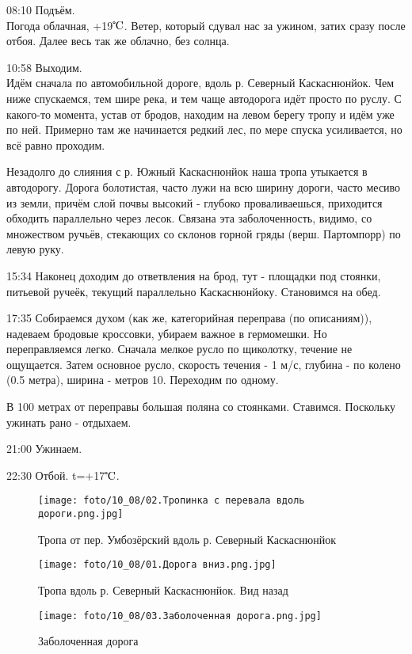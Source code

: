 08:10 Подъём.\\
Погода облачная, +19$\tccentigrade$. Ветер, который сдувал нас за ужином, затих сразу после отбоя.
Далее весь так же облачно, без солнца.

10:58 Выходим.\\
Идём сначала по автомобильной дороге, вдоль р. Северный Каскаснюнйок. Чем ниже спускаемся, тем шире река,
и тем чаще автодорога идёт просто по руслу. С какого-то момента, устав от бродов, находим на левом берегу тропу
и идём уже по ней.  Примерно там же начинается редкий лес, по мере спуска усиливается, но всё равно проходим.

Незадолго до слияния с р. Южный Каскаснюнйок наша тропа утыкается в автодорогу.
Дорога болотистая, часто лужи на всю ширину дороги, часто месиво из земли, причём слой почвы высокий - глубоко проваливаешься,
приходится обходить параллельно через лесок. Связана эта заболоченность, видимо, со множеством ручьёв,
стекающих со склонов горной гряды (верш. Партомпорр) по левую руку.

15:34 Наконец доходим до ответвления на брод, тут - площадки под стоянки, питьевой ручеёк, текущий параллельно Каскаснюнйоку.
Становимся на обед.

17:35 Собираемся духом (как же, категорийная переправа (по описаниям)), надеваем бродовые кроссовки,
убираем важное в гермомешки. Но переправляемся легко. Сначала мелкое русло по щиколотку, течение не ощущается.
Затем основное русло, скорость течения - 1 м/с, глубина - по колено (0.5 метра), ширина - метров 10. Переходим по одному.

В 100 метрах от переправы большая поляна со стоянками. Ставимся. Поскольку ужинать рано - отдыхаем.

21:00 Ужинаем.

22:30 Отбой. t=+17$\tccentigrade$.

\begin{figure}
    \centering
    \texttt{[image: foto/10\_08/02.Тропинка с перевала вдоль дороги.png.jpg]}
    \caption{Тропа от пер. Умбозёрский вдоль р. Северный Каскаснюнйок}
\end{figure}

\begin{figure}
    \centering
    \texttt{[image: foto/10\_08/01.Дорога вниз.png.jpg]}
    \caption{Тропа вдоль р. Северный Каскаснюнйок. Вид назад}
\end{figure}

\begin{figure}
    \centering
    \texttt{[image: foto/10\_08/03.Заболоченная дорога.png.jpg]}
    \caption{Заболоченная дорога}
\end{figure}

